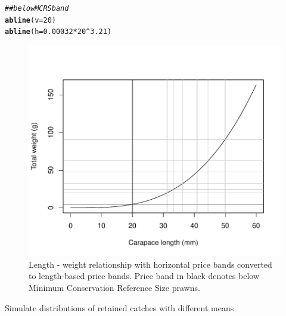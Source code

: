 \documentclass[12pt]{article}\usepackage[]{graphicx}\usepackage[]{color}
\makeatletter
\def\maxwidth{ %
  \ifdim\Gin@nat@width>\linewidth
    \linewidth
  \else
    \Gin@nat@width
  \fi
}
\newcommand{\hlnum}[1]{\textcolor[rgb]{0.686,0.059,0.569}{#1}}%
\newcommand{\hlcom}[1]{\textcolor[rgb]{0.678,0.584,0.686}{\textit{#1}}}%
\newcommand{\hlopt}[1]{\textcolor[rgb]{0,0,0}{#1}}%
\newcommand{\hlstd}[1]{\textcolor[rgb]{0.345,0.345,0.345}{#1}}%
\newcommand{\hlkwc}[1]{\textcolor[rgb]{0.333,0.667,0.333}{#1}}%
\newcommand{\hlkwd}[1]{\textcolor[rgb]{0.737,0.353,0.396}{\textbf{#1}}}%
\newenvironment{kframe}{%
 \def\at@end@of@kframe{}%
 \ifinner\ifhmode%
  \def\at@end@of@kframe{\end{minipage}}%
  \begin{minipage}{\columnwidth}%
 \fi\fi%
 \def\FrameCommand##1{\hskip\@totalleftmargin \hskip-\fboxsep
 \colorbox{shadecolor}{##1}\hskip-\fboxsep
     \hskip-\linewidth \hskip-\@totalleftmargin \hskip\columnwidth}%
 \MakeFramed {\advance\hsize-\width
   \@totalleftmargin\z@ \linewidth\hsize
   \@setminipage}}%
 {\par\unskip\endMakeFramed%
 \at@end@of@kframe}
\newenvironment{knitrout}{}{} %
\makeatother
\begin{document}
\begin{knitrout}
\begin{kframe}
\begin{alltt}
\hlcom{## below MCRS band}
\hlkwd{abline}\hlstd{(}\hlkwc{v} \hlstd{=} \hlnum{20}\hlstd{)}
\hlkwd{abline}\hlstd{(}\hlkwc{h} \hlstd{=} \hlnum{0.00032}\hlopt{*}\hlnum{20}\hlopt{^}\hlnum{3.21}\hlstd{)}
\end{alltt}
\end{kframe}\begin{figure}
\includegraphics[width=\maxwidth]{figure/lw-1} \caption[Length - weight relationship with horizontal price bands converted to length-based price bands]{Length - weight relationship with horizontal price bands converted to length-based price bands. Price band in black denotes below Minimum Conservation Reference Size prawns.}\label{fig:lw}
\end{figure}


\end{knitrout}

Simulate distributions of retained catches with different means
\end{document}
